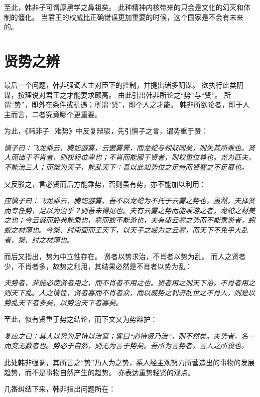 \documentclass[11pt]{article}
\begin{document}
\par

至此，韩非子可谓厚黑学之鼻祖矣。
此种精神内核带来的只会是文化的幻灭和体制的僵化。
当君王的权威比正确错误更加重要的时候，这个国家是不会有未来的。
  
\section{贤势之辨}
最后一个问题，韩非强调人主对臣下的控制，并提出诸多阴谋。
欲执行此类阴谋，按理说对君王之才能要求颇高。
由此引出韩非所论之“势”与“贤”。
所谓“势”，即外在条件或机遇；所谓“贤”，即个人之才能。
韩非所欲论者，即于人主而言，二者究竟哪个更重要。

\par
  
为此，《韩非子·难势》中反复辩驳，先引慎子之言，谓势重于贤：

\textit{慎子曰：飞龙乘云，腾蛇游雾，云罢雾霁，而龙蛇与蚓蚁同矣，则失其所乘也。贤人而诎于不肖者，则权轻位卑也；不肖而能服于贤者，则权重位尊也。尧为匹夫，不能治三人；而桀为天子，能乱天下：吾以此知势位之足恃而贤智之不足慕也。}

又反驳之，言必贤而后方能乘势，否则虽有势，亦不能加以利用：

\textit{应慎子曰：飞龙乘云，腾蛇游雾，吾不以龙蛇为不托于云雾之势也。虽然，夫择贤而专任势，足以为治乎？则吾未得见也。夫有云雾之势而能乘游之者，龙蛇之材美之也；今云盛而蚓弗能乘也，雾而蚁不能游也，夫有盛云雾之势而不能乘游者，蚓蚁之材薄也。今桀、纣南面而王天下，以天子之威为之云雾，而天下不免乎大乱者，桀、纣之材薄也。}

而后又指出，势为中立性存在。
贤者以势求治，不肖者以势为乱。
而人之贤者少，不肖者多，故势之利用，其结果必然是不肖者以势为乱：

\textit{夫势者，非能必使贤者用之，而不肖者不用之也。贤者用之则天下治，不肖者用之则天下乱。人之情性，贤者寡而不肖者众，而以威势之利济乱世之不肖人，则是以势乱天下者多矣，以势治天下者寡矣。}

至此，似有贤重于势之结论，而下文又为势辩护：

\textit{复应之曰：其人以势为足恃以治官；客曰“必待贤乃治”，则不然矣。夫势者，名一而变无数者也。势必于自然，则无为言于势矣。吾所为言势者，言人之所设也。}

此处韩非强调，其所言之“势”乃人为之势，系人经主观努力所营造出的事物的发展趋势，而不是事物自然产生的趋势。
亦表达重势轻贤的观点。

\par

几番纠结下来，韩非指出问题所在：
\end{document}
